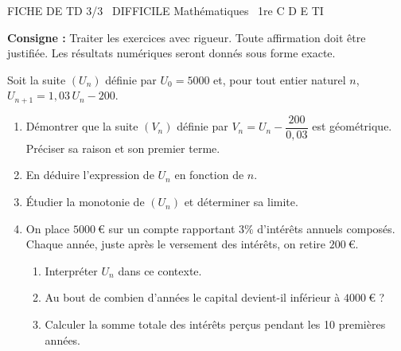 \documentclass[11pt]{article}
\begin{document}
\begin{tcolorbox}[enhanced,colback=popink,colframe=popink,arc=10pt,boxrule=0pt,left=12pt,right=12pt,top=9pt,bottom=9pt]
{\color{white}\popxbold\small FICHE DE TD 3/3 \textbullet\ DIFFICILE \hfill Mathématiques \textbullet\ 1re C D E TI\par}
\end{tcolorbox}
\vspace{4pt}
\noindent \textbf{Consigne :} Traiter les exercices avec rigueur. Toute affirmation doit être justifiée. Les résultats numériques seront donnés sous forme exacte.

\begin{exercice}
Soit la suite $(U_n)$ définie par $U_0 = 5000$ et, pour tout entier naturel $n$, $U_{n+1} = 1,03\,U_n - 200$.
\begin{enumerate}
    \item Démontrer que la suite $(V_n)$ définie par $V_n = U_n - \dfrac{200}{0,03}$ est géométrique. Préciser sa raison et son premier terme.
    \item En déduire l'expression de $U_n$ en fonction de $n$.
    \item Étudier la monotonie de $(U_n)$ et déterminer sa limite.
    \item On place $\SI{5000}{\euro}$ sur un compte rapportant $3\%$ d'intérêts annuels composés. Chaque année, juste après le versement des intérêts, on retire $\SI{200}{\euro}$. 
    \begin{enumerate}
        \item Interpréter $U_n$ dans ce contexte.
        \item Au bout de combien d'années le capital devient-il inférieur à $\SI{4000}{\euro}$ ?
        \item Calculer la somme totale des intérêts perçus pendant les 10 premières années.
    \end{enumerate}
\end{enumerate}
\end{exercice}
\end{document}
